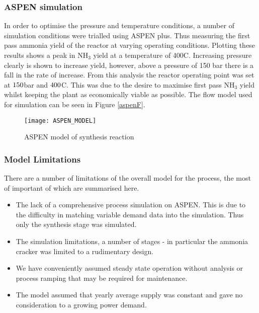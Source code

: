 \subsubsection{ASPEN simulation}
In order to optimise the pressure and temperature conditions, a number of simulation conditions were trialled using ASPEN plus. Thus measuring the first pass ammonia yield of the reactor at varying operating conditions. Plotting these results shows a peak in NH$_3$ yield at a temperature of 400\textdegree C. Increasing pressure clearly is shown to increase yield, however, above a pressure of 150 bar there is a fall in the rate of increase. From this analysis the reactor operating point was set at $150$bar and $400$\textdegree C. This was due to the desire to maximise first pass NH$_3$ yield whilst keeping the plant as economically viable as possible. The flow model used for simulation can be seen in Figure \ref{aspenF}.



%    
%

{\centering
	\begin{figure}[!htbp]
		\texttt{[image: ASPEN\_MODEL]}
		\caption{ASPEN model of synthesis reaction 	\label{fig:aspenF}}
\end{figure}}
\subsubsection{Model Limitations}
There are a number of limitations of the overall model for the process, the most of important of which are summarised here. 
\begin{itemize}
	\item The lack of a comprehensive process simulation on ASPEN. This is due to the difficulty in matching variable demand data into the simulation. Thus only the synthesis stage was simulated. 
\item The simulation limitations, a number of stages - in particular the ammonia cracker was limited to a rudimentary design. 
\item We have conveniently assumed steady state operation without analysis or process ramping that may be required for maintenance. 
\item The model assumed that yearly average supply was constant and gave no consideration to a growing power demand. 
\end{itemize}
